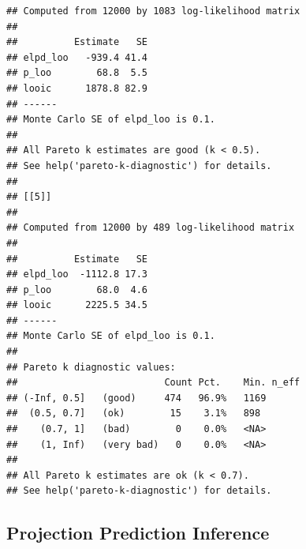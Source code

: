 \documentclass[
]{article}
\begin{document}
\begin{verbatim}
## Computed from 12000 by 1083 log-likelihood matrix
## 
##          Estimate   SE
## elpd_loo   -939.4 41.4
## p_loo        68.8  5.5
## looic      1878.8 82.9
## ------
## Monte Carlo SE of elpd_loo is 0.1.
## 
## All Pareto k estimates are good (k < 0.5).
## See help('pareto-k-diagnostic') for details.
## 
## [[5]]
## 
## Computed from 12000 by 489 log-likelihood matrix
## 
##          Estimate   SE
## elpd_loo  -1112.8 17.3
## p_loo        68.0  4.6
## looic      2225.5 34.5
## ------
## Monte Carlo SE of elpd_loo is 0.1.
## 
## Pareto k diagnostic values:
##                          Count Pct.    Min. n_eff
## (-Inf, 0.5]   (good)     474   96.9%   1169      
##  (0.5, 0.7]   (ok)        15    3.1%   898       
##    (0.7, 1]   (bad)        0    0.0%   <NA>      
##    (1, Inf)   (very bad)   0    0.0%   <NA>      
## 
## All Pareto k estimates are ok (k < 0.7).
## See help('pareto-k-diagnostic') for details.
\end{verbatim}

\hypertarget{projection-prediction-inference}{%
\subsection{Projection Prediction Inference}\label{projection-prediction-inference}}
\end{document}
